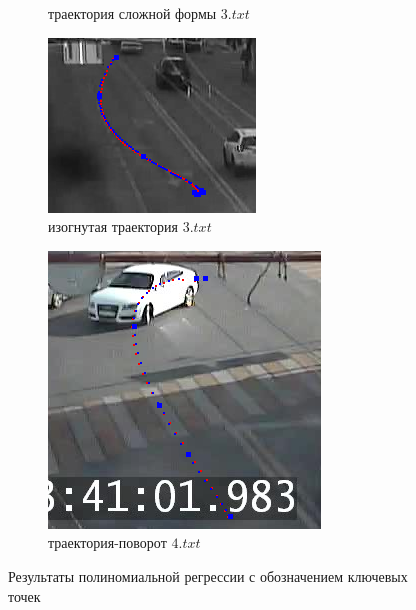 \begin{figure}[!htb]
\begin{subfigure}[!htb]{0.3\textwidth}
		\caption{траектория сложной формы $3.txt$}
	\end{subfigure}
	\hfill
	\begin{subfigure}[!htb]{0.3\textwidth}
		\centering{}
		\includegraphics[width=\textwidth]{images/regr_kp_curve_3.png}
		\caption{изогнутая траектория $3.txt$}
	\end{subfigure}
	\hfill
	\begin{subfigure}[!htb]{0.3\textwidth}
		\centering{}
		\includegraphics[width=\textwidth]{images/regr_kp_curve_4.png}
		\caption{траектория-поворот $4.txt$}
	\end{subfigure}

	\caption{Результаты полиномиальной регрессии с обозначением ключевых точек}
	\label{fig:regr-kp}
\end{figure}


